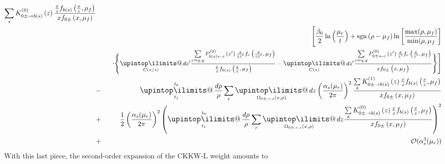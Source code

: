 \documentclass[a4paper,11pt]{article}
\makeatletter
\newcommand{\mksmall}[1]{\textnormal{\smaller$#1$}}
\newcommand{\sgn}[2]{\mathrm{sgn}\left(#1-#2\right)}
\newcommand{\xfhat}[3]{#2 \widehat{f}_{#1}\left(#2, #3\right)}
\newcommand{\xf}[3]{#2 f_{#1}\left(#2, #3\right)}
\newcommand{\lodglapkernel}[3]{P_{#1\leftarrow #2}^{(0)}\left(#3\right)}
\newcommand{\lopskernel}[3]{K_{#1\rightarrow #2}^{(0)}\left(#3\right)}
\newcommand{\nlopskernel}[3]{K_{#1\rightarrow #2}^{(1)}\left(#3\right)}
\newcommand{\upint}{\DOTSI\upintop\ilimits@}
\renewcommand{\int}{\mathop{\mathlarger{\upint}}}
\makeatother
\begin{document}
\begin{eqnarray*}
\sum\limits_s\lopskernel{0\pm}{b(s)}{z}
\frac{\xf{b(s)}{\frac{x}{z}}{\mu_f}}{\xf{0\pm}{x}{\mu_f}} 
\\
&&\Bigg[
\frac{\beta_0}{2}\ln\left(\frac{\mu_r}{t}\right)
+
\sgn{\rho}{\mu_f}
\ln\left[\frac{\max(\rho,\mu_f)}{\min(\rho,\mu_f}\right]
\\&&~~\cdot
\Bigg\{
\mksmall{\int\displaylimits_{C(x/z)}  dz' 
\frac{ \sum\limits_{c=q,g} \lodglapkernel{b(s)}{c}{z'} \xf{c}{\frac{x}{zz'}}{\mu_f} }
     { \xf{b(s)}{\frac{x}{z}}{\mu_f}}
 -
\int\displaylimits_{C(x)}  dz' 
\frac{  \sum\limits_{c=q,g} \lodglapkernel{0\pm}{c}{z'} \xf{c}{\frac{x}{z'}}{\mu_f}}{\xf{0\pm}{x}{\mu_f}}
}
\Bigg\}
\Bigg]
\\
&-&
\int\displaylimits_{t_1}^{t_0} \frac{d\rho}{\rho} \sum\limits_{r} \int\displaylimits_{\Omega_{0\pm,r,s}(x,\rho)} dz
\left(\frac{\alpha_s(\mu_r)}{2\pi}\right)^2
\frac{\sum\limits_s\nlopskernel{0\pm}{b(s)}{z} \xf{b(s)}{\frac{x}{z}}{\mu_f}}{\xf{0\pm}{x}{\mu_f}}
\\&+&
\frac{1}{2}
\left(\frac{\alpha_s(\mu_r)}{2\pi}\right)^2
\left(
\int\displaylimits_{t_1}^{t_0} \frac{d\rho}{\rho} \sum\limits_{r} \int\displaylimits_{\Omega_{0\pm,r,s}(x,\rho)} dz
\frac{\sum\limits_s\lopskernel{0\pm}{b(s)}{z} \xf{b(s)}{\frac{x}{z}}{\mu_f}}{\xf{0\pm}{x}{\mu_f}} 
\right)^2 
\\
&+&
\mathcal{O}(\alpha_s^3(\mu_r))
\end{eqnarray*}
With this last piece, the second-order expansion of the CKKW-L weight amounts to
\end{document}
